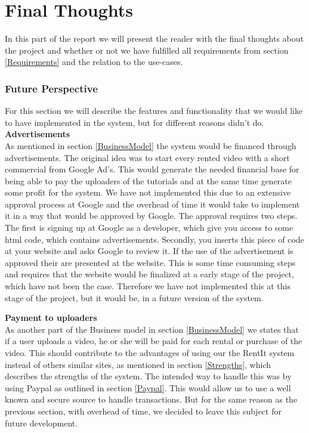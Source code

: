 \part{Final Thoughts}
In this part of the report we will present the reader with the final thoughts about the project and whether or not we have fulfilled all requirements from section \ref{Requirements} and the relation to the use-cases.

\section{Future Perspective}
For this section we will describe the features and functionality that we would like to have implemented in the system, but for different reasons didn't do.\\


\textbf{Advertisements}\\

As mentioned in section \ref{BusinessModel} the system would be financed through advertisements. The original idea was to start every rented video with a short commercial from Google Ad's. This would generate the needed financial base for being able to pay the uploaders of the tutorials and at the same time generate some profit for the system. We have not implemented this due to an extensive approval process at Google and the overhead of time it would take to implement it in a way that would be approved by Google. The approval requires two steps. The first is signing up at Google as a developer, which give you access to some html code, which contains advertisements. Secondly, you inserts this piece of code at your website and asks Google to review it. If the use of the advertisement is approved their are presented at the website.  This is some time consuming steps and requires that the website would be finalized at a early stage of the project, which have not been the case. Therefore we have not implemented this at this stage of the project, but it would be, in a future version of the system. 

\textbf{Payment to uploaders}\\

As another part of the Business model in section \ref{BusinessModel} we states that if a user uploads a video, he or she will be paid for each rental or purchase of the video. This should contribute to the advantages of using our the RentIt system instead of others similar sites, as mentioned in section \ref{Strengths}, which describes the strengths of the system. The intended way to handle this was by using Paypal as outlined in section \ref{Paypal}. This would allow us to use a well known and secure source to handle transactions. But for the same reason as the previous section, with overhead of time, we decided to leave this subject for future development.

